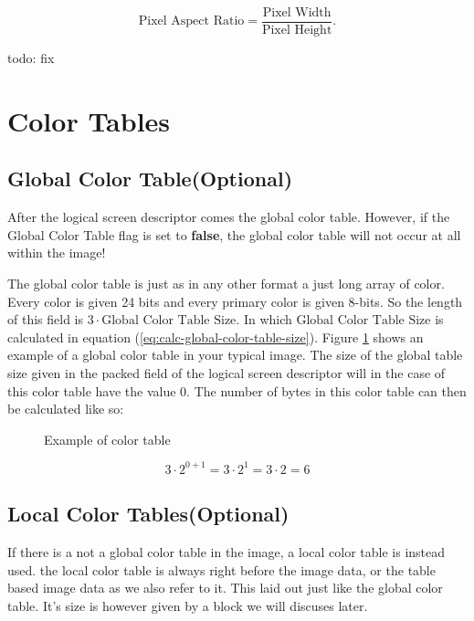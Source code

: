 \begin{refsection}
  \begin{equation*}
    \textrm{Pixel Aspect Ratio} = \frac{\text{Pixel Width}}{\text{Pixel Height}}.
  \end{equation*}

  todo: fix

  \section{Color Tables}

  \subsection{Global Color Table(Optional)}

  After the logical screen descriptor comes the global color
  table. However, if the Global Color Table flag is set to
  \textbf{false}, the global color table will not occur at all within
  the image!

  The global color table is just as in any other format a just long
  array of color. Every color is given 24 bits and every primary color
  is given 8-bits. So the length of this field is $3 \cdot
  \textrm{Global Color Table Size}$. In which $\textrm{Global Color
    Table Size}$ is calculated in equation
  (\ref{eq:calc-global-color-table-size}). Figure
  \ref{fig:gif-color-table} shows an example of a global color table
  in your typical \gif image. The size of the global table size given
  in the packed field of the logical screen descriptor will in the
  case of this color table have the value $0$. The number of bytes in
  this color table can then be calculated like so:

  \begin{figure}
    \centering
    \caption{Example of \gif color table }
    \label{fig:gif-color-table}
  \end{figure}

  \begin{equation*}
    3 \cdot 2^{0 +1} = 3 \cdot 2^1 = 3 \cdot 2 = 6
  \end{equation*}

  \subsection{Local Color Tables(Optional)}

  If there is a not a global color table in the \gif image, a local
  color table is instead used. the local color table is always right
  before the image data, or the table based image data as we also
  refer to it. This laid out just like the global color table. It's
  size is however given by a block we will discuses later.


\end{refsection}
